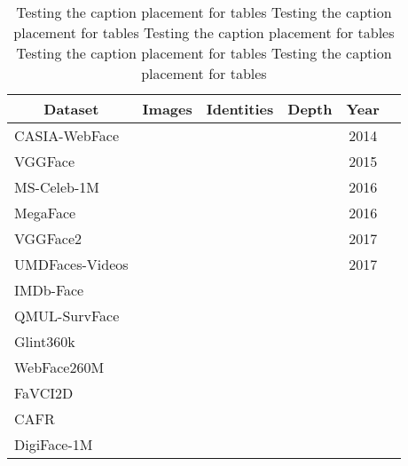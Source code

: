 \documentclass[class=report, crop=false, a4paper, 12pt]{standalone}
\begin{document}
\begin{table}[!ht]
    \centering
    \begin{tabular}{|l|c|c|c|c|c|}
    \hline
    \multicolumn{1}{|c|}{\textbf{Dataset}} & \textbf{Images} & \textbf{Identities} & \textbf{Depth} & \textbf{Year} & \textbf{} \\ \hline
    CASIA-WebFace                          &                 &                     &                    & 2014          &           \\ \hline
    VGGFace                                &                 &                     &                    & 2015          &           \\ \hline
    MS-Celeb-1M                            &                 &                     &                    & 2016          &           \\ \hline
    MegaFace                               &                 &                     &                    & 2016          &           \\ \hline
    VGGFace2                               &                 &                     &                    & 2017          &           \\ \hline
    UMDFaces-Videos                        &                 &                     &                    & 2017          &           \\ \hline
    IMDb-Face                              &                 &                     &                    &               &           \\ \hline
    QMUL-SurvFace                          &                 &                     &                    &               &           \\ \hline
    Glint360k                              &                 &                     &                    &               &           \\ \hline
    WebFace260M                            &                 &                     &                    &               &           \\ \hline
    FaVCI2D                                &                 &                     &                    &               &           \\ \hline
    CAFR                                   &                 &                     &                    &               &           \\ \hline
    DigiFace-1M                            &                 &                     &                    &               &           \\ \hline
    \end{tabular}
    \caption{Testing the caption placement for tables Testing the caption placement for tables Testing the caption placement for tables Testing the caption placement for tables Testing the caption placement for tables}
    \label{tab:tab1}
\end{table}
\end{document}
